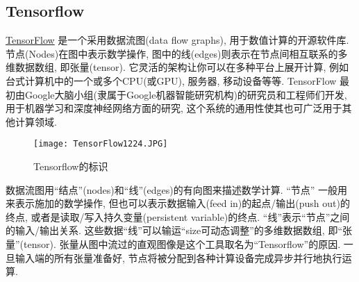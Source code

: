 \subsection{Tensorflow}
\href{https://tensorflow.google.cn/}{TensorFlow} 是一个采用数据流图(data flow graphs), 用于数值计算的开源软件库. 节点(Nodes)在图中表示数学操作, 图中的线(edges)则表示在节点间相互联系的多维数据数组, 即张量(tensor). 它灵活的架构让你可以在多种平台上展开计算, 例如台式计算机中的一个或多个CPU(或GPU), 服务器, 移动设备等等. TensorFlow 最初由Google大脑小组(隶属于Google机器智能研究机构)的研究员和工程师们开发, 用于机器学习和深度神经网络方面的研究, 这个系统的通用性使其也可广泛用于其他计算领域.
\begin{figure}[htbp]
\centering
\texttt{[image: TensorFlow1224.JPG]}
\caption{Tensorflow的标识}
\label{TensorFlow1224}
\end{figure}
数据流图用“结点”(nodes)和“线”(edges)的有向图来描述数学计算. “节点” 一般用来表示施加的数学操作, 但也可以表示数据输入(feed in)的起点/输出(push out)的终点, 或者是读取/写入持久变量(persistent variable)的终点. “线”表示“节点”之间的输入/输出关系. 这些数据“线”可以输运“size可动态调整”的多维数据数组, 即“张量”(tensor). 张量从图中流过的直观图像是这个工具取名为“Tensorflow”的原因. 一旦输入端的所有张量准备好, 节点将被分配到各种计算设备完成异步并行地执行运算.

